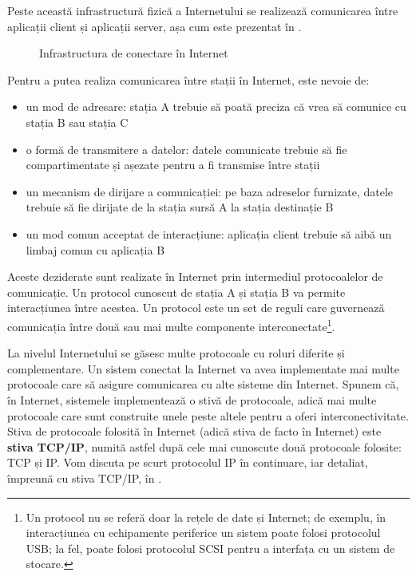 Peste această infrastructură fizică a Internetului se realizează comunicarea între aplicații client și aplicații server, așa cum este prezentat în .

\begin{figure}[htbp]
  \centering
  \def\svgwidth{\columnwidth}
  
  \caption{Infrastructura de conectare în Internet}
  \label{fig:net:internet-infrastructure}
\end{figure}

Pentru a putea realiza comunicarea între stații în Internet, este nevoie de:

\begin{itemize}
  \item un mod de adresare: stația A trebuie să poată preciza că vrea să comunice cu stația B sau stația C
  \item o formă de transmitere a datelor: datele comunicate trebuie să fie compartimentate și așezate pentru a fi transmise între stații
  \item un mecanism de dirijare a comunicației: pe baza adreselor furnizate, datele trebuie să fie dirijate de la stația sursă A la stația destinație B
  \item un mod comun acceptat de interacțiune: aplicația client trebuie să aibă un limbaj comun cu aplicația B
\end{itemize}

Aceste deziderate sunt realizate în Internet prin intermediul protocoalelor de comunicație.
Un protocol cunoscut de stația A și stația B va permite interacțiunea între acestea.
Un protocol este un set de reguli care guvernează comunicația între două sau mai multe componente interconectate\footnote{Un protocol nu se referă doar la rețele de date și Internet; de exemplu, în interacțiunea cu echipamente periferice un sistem poate folosi protocolul USB; la fel, poate folosi protocolul SCSI pentru a interfața cu un sistem de stocare.}.

La nivelul Internetului se găsesc multe protocoale cu roluri diferite și complementare.
Un sistem conectat la Internet va avea implementate mai multe protocoale care să asigure comunicarea cu alte sisteme din Internet.
Spunem că, în Internet, sistemele implementează o stivă de protocoale, adică mai multe protocoale care sunt construite unele peste altele pentru a oferi interconectivitate.
Stiva de protocoale folosită în Internet (adică stiva de facto în Internet) este \textbf{stiva TCP/IP}, numită astfel după cele mai cunoscute două protocoale folosite: TCP și IP.
Vom discuta pe scurt protocolul IP în continuare, iar detaliat, împreună cu stiva TCP/IP, în .

